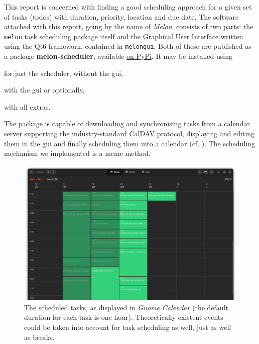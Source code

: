 \documentclass{prettytex/ox/mmsc-special-topic}
\begin{document}
  This report is concerned with finding a good scheduling approach for a given set of tasks (todos) with duration, priority, location and due date.
  The software attached with this report, going by the name of \textit{Melon}, consists of two parts: the \texttt{melon} task scheduling package itself and the Graphical User Interface written using the Qt6 framework, contained in \texttt{melongui}.
  Both of these are published as a package \textbf{melon-scheduler}, available \href{https://pypi.org/project/melon-scheduler/}{on PyPi}. It may be installed using

  for just the scheduler, without the \gls{gui},

   with the \gls{gui} or optionally,

   with all extras.

  The package is capable of downloading and synchronising tasks from a calendar server supporting the industry-standard CalDAV protocol, displaying and editing them in the \gls{gui} and finally scheduling them into a calendar (cf. ).
  The scheduling mechanism we implemented is a \gls{mcmc} method.

  \begin{figure}[H]
    \centering
    \includegraphics[width=\linewidth]{figures/exported-calendar.png}
    \caption{The scheduled tasks, as displayed in \textit{Gnome Calendar} (the default duration for each task is one hour). Theoretically existent events could be taken into account for task scheduling as well, just as well as breaks.}
    \label{fig:calendar}
  \end{figure}
\end{document}
